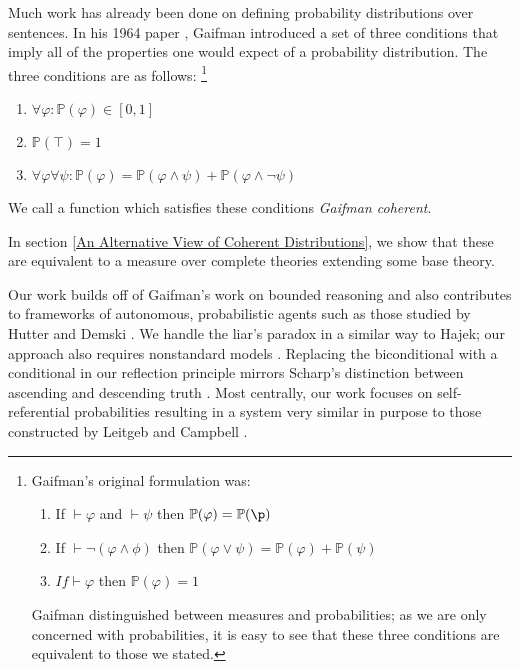 \documentclass[12pt]{article}
\newcommand{\PP}{\mathbb{P}}
\theoremstyle{plain}
\theoremstyle{definition}
\theoremstyle{remark}
\begin{document}
Much work has already been done on defining probability distributions over sentences. In his 1964 paper \cite{gaifman64}, Gaifman introduced a set of three conditions that imply all of the properties one would expect of a probability distribution. The three conditions are as follows: 
\footnote{Gaifman's original formulation was:
\begin{enumerate}
\item If $\vdash \varphi$ and $\vdash \psi$ then $\PP(\varphi)=\PP(\p)$
\item If $\vdash \neg (\varphi \wedge \phi)$ then $\PP(\varphi \vee \psi) = \PP(\varphi) + \PP(\psi)$
\item $If \vdash \varphi$ then $\PP(\varphi) = 1$
\end{enumerate}
Gaifman distinguished between measures and probabilities; as we are only concerned with probabilities, it is easy to see that these three conditions are equivalent to those we stated.}

\begin{enumerate}
\item $\forall \varphi: \PP(\varphi) \in [0,1]$
\item $\PP(\top) = 1$
\item $\forall \varphi \forall \psi: \PP(\varphi) = \PP(\varphi \wedge \psi) + \PP(\varphi \wedge \neg \psi)$
\end{enumerate}
We call a function which satisfies these conditions \emph{Gaifman coherent}.



In section \ref{An Alternative View of Coherent Distributions}, we show that these are equivalent to a measure over complete theories extending some base theory.


% 


Our work builds off of Gaifman's work on bounded reasoning \cite{gaifman04} and also contributes 
to frameworks of autonomous, probabilistic agents such as those studied by Hutter and Demski
\cite{hutter13,demski12}.
We handle the liar's paradox in a similar way to Hajek; our approach also requires nonstandard models \cite{hajek98}.
Replacing the biconditional with a conditional in our reflection principle mirrors Scharp's distinction between ascending and descending truth \cite{scharp13}.
Most centrally, our work focuses on self-referential probabilities resulting in a system very similar in purpose to those constructed by Leitgeb and Campbell \cite{leitgeb08,leitgeb12a,leitgeb12b,campbell14}.
\end{document}
